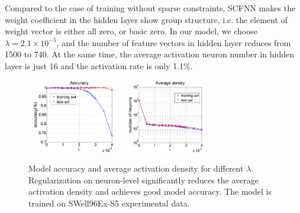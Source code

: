 Compared to the case of training without sparse constraints, SCFNN makes the weight coefficient in the hidden layer show group structure, i.e. the element of weight vector is either all zero, or basic zero.
In our model, we choose $\lambda=2.1 \times 10^{-5} $, and the number of feature vectors in hidden layer reduces from 1500 to 740. At the same time, the average activation neuron number in hidden layer is just 16 and the activation rate is only 1.1{\%}.
\begin{figure}
\includegraphics[width=4cm,height=3.2cm]{figure/Accuracy_on_SWellEx_S5_for_different_lambda}
\includegraphics[width=4cm,height=3.2cm]{figure/Hidden_Average_Density_on_SWellEx_S5_for_different_lambda}
\caption{Model accuracy and average activation density for different $\lambda $. Regularization on neuron-level
significantly reduces the average activation density and achieves good model accuracy. The model is trained on SWell96Ex-S5 experimental data.}
\end{figure}

